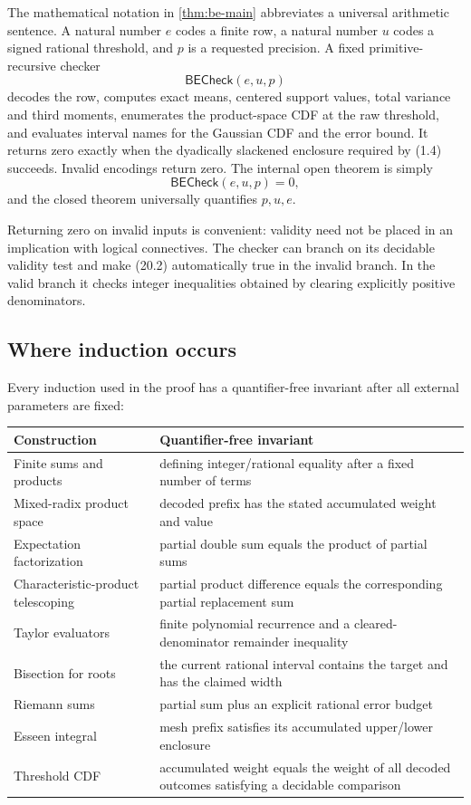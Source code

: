 \documentclass[11pt]{article}
\begin{document}
The mathematical notation in \cref{thm:be-main} abbreviates a universal
arithmetic sentence.  A natural number \(e\) codes a finite row, a natural
number \(u\) codes a signed rational threshold, and \(p\) is a requested
precision.  A fixed primitive-recursive checker
\[
 \mathsf{BECheck}(e,u,p)                               \tag{20.1}
\]
decodes the row, computes exact means, centered support values, total
variance and third moments, enumerates the product-space CDF at the raw
threshold, and evaluates interval names for the Gaussian CDF and the error
bound.  It returns zero exactly when the dyadically slackened enclosure
required by (1.4) succeeds.  Invalid encodings return zero.  The internal
open theorem is simply
\[
 \mathsf{BECheck}(e,u,p)=0,                            \tag{20.2}
\]
and the closed theorem universally quantifies \(p,u,e\).

Returning zero on invalid inputs is convenient: validity need not be placed
in an implication with logical connectives.  The checker can branch on its
decidable validity test and make (20.2) automatically true in the invalid
branch.  In the valid branch it checks integer inequalities obtained by
clearing explicitly positive denominators.

\subsection{Where induction occurs}

Every induction used in the proof has a quantifier-free invariant after all
external parameters are fixed:

\begin{center}
\begin{tabular}{p{}p{}}
\toprule
Construction & Quantifier-free invariant \\
\midrule
Finite sums and products & defining integer/rational equality after a fixed number of terms \\
Mixed-radix product space & decoded prefix has the stated accumulated weight and value \\
Expectation factorization & partial double sum equals the product of partial sums \\
Characteristic-product telescoping & partial product difference equals the corresponding partial replacement sum \\
Taylor evaluators & finite polynomial recurrence and a cleared-denominator remainder inequality \\
Bisection for roots & the current rational interval contains the target and has the claimed width \\
Riemann sums & partial sum plus an explicit rational error budget \\
Esseen integral & mesh prefix satisfies its accumulated upper/lower enclosure \\
Threshold CDF & accumulated weight equals the weight of all decoded outcomes satisfying a decidable comparison \\
\bottomrule
\end{tabular}
\end{center}
\end{document}
